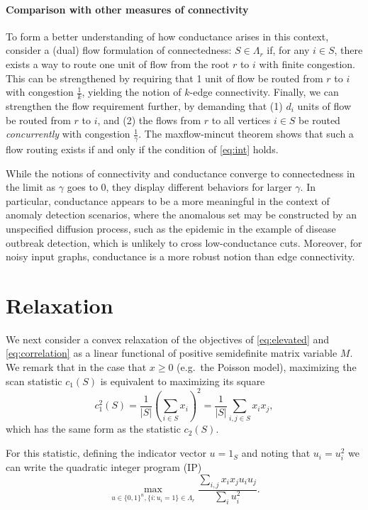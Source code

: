 \documentclass{article}
\begin{document}
\paragraph{Comparison with other measures of connectivity}
To form a better understanding of how conductance arises in this context, consider a (dual) flow formulation of connectedness: $S \in \Lambda_r$ if, for any $i \in S$, there exists a way to route one unit of flow from the root $r$ to $i$ with finite congestion. This can be strengthened by requiring that 1 unit of flow be routed from $r$ to $i$ with congestion $\frac{1}{k}$, yielding the notion of $k$-edge connectivity. Finally, we can strengthen the flow requirement further, by demanding that (1) $d_i$ units of flow be routed from $r$ to $i$, and (2) the flows from $r$ to all vertices $i \in S$ be routed {\it concurrently} with congestion $\frac{1}{\gamma}$. The maxflow-mincut theorem shows that such a flow routing exists if and only if the condition of \eqref{eq:int} holds.

While the notions of connectivity and conductance converge to connectedness in the limit as $\gamma$ goes to $0$, they display different behaviors for larger $\gamma$. In particular, conductance appears to be a more meaningful in the context of anomaly detection scenarios, where the anomalous set may be constructed by an unspecified diffusion process, such as the epidemic in the example of disease outbreak detection, which is unlikely to cross low-conductance cuts. Moreover, for noisy input graphs, conductance is a more robust notion than edge connectivity.


\section{Relaxation}

We next consider a convex relaxation of the objectives of \eqref{eq:elevated} and \eqref{eq:correlation} as a linear functional of positive semidefinite matrix variable $M$. We remark that in the case that $x \geq 0$ (e.g.\ the Poisson model), maximizing the scan statistic $c_1(S)$ is equivalent to maximizing its square
\begin{equation}
  c_1^2(S) = \frac{1}{|S|} \left(\sum_{i \in S} x_i \right)^2 = \frac{1}{|S|} \sum_{i,j \in S} x_i x_j,
  \label{eq:elevated2}
\end{equation}
which has the same form as the statistic $c_2(S)$.

For this statistic, defining the indicator vector $u = 1_S$ and noting that $u_i = u_i^2$ we can write the quadratic integer program (IP)
\begin{equation}\label{eq:original_u2}
  \max_{u \in \{0,1\}^n, \{i: u_i = 1\} \in \Lambda_r} \frac{\sum_{i,j} x_i x_j u_i u_j}{\sum_i u_i^2}.
\end{equation}
\end{document}
